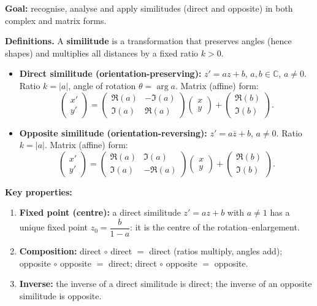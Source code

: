 \documentclass[11pt]{article}
\begin{document}
\begin{methode}
\textbf{Goal:} recognise, analyse and apply similitudes (direct and opposite) in both complex and matrix forms.

\textbf{Definitions.} A \textbf{similitude} is a transformation that preserves angles (hence shapes) and multiplies all distances by a fixed ratio $k>0$.
\begin{itemize}
    \item \textbf{Direct similitude (orientation-preserving):} $z' = az + b$, $a,b \in \mathbb{C}$, $a \ne 0$. Ratio $k = |a|$, angle of rotation $\theta = \arg a$.
    Matrix (affine) form:
    \[
    \begin{pmatrix} x' \\ y' \end{pmatrix} = \begin{pmatrix} \Re(a) & -\Im(a) \\ \Im(a) & \Re(a) \end{pmatrix} \begin{pmatrix} x \\ y \end{pmatrix} + \begin{pmatrix} \Re(b) \\ \Im(b) \end{pmatrix}.
    \]
    \item \textbf{Opposite similitude (orientation-reversing):} $z' = a\bar{z} + b$, $a \ne 0$. Ratio $k = |a|$.
    Matrix (affine) form:
    \[
    \begin{pmatrix} x' \\ y' \end{pmatrix} = \begin{pmatrix} \Re(a) & \Im(a) \\ \Im(a) & -\Re(a) \end{pmatrix} \begin{pmatrix} x \\ y \end{pmatrix} + \begin{pmatrix} \Re(b) \\ \Im(b) \end{pmatrix}.
    \]
\end{itemize}

\textbf{Key properties:}
\begin{enumerate}
    \item \textbf{Fixed point (centre):} a direct similitude $z' = az+b$ with $a\ne 1$ has a unique fixed point $z_0 = \dfrac{b}{1-a}$: it is the centre of the rotation--enlargement.
    \item \textbf{Composition:} direct $\circ$ direct $=$ direct (ratios multiply, angles add); opposite $\circ$ opposite $=$ direct; direct $\circ$ opposite $=$ opposite.
    \item \textbf{Inverse:} the inverse of a direct similitude is direct; the inverse of an opposite similitude is opposite.
\end{enumerate}


\end{methode}
\end{document}
